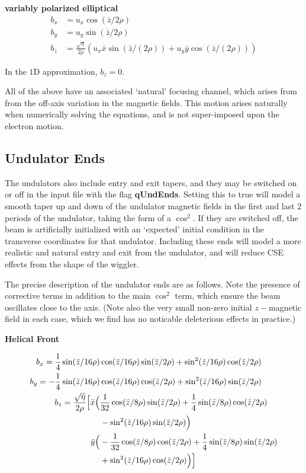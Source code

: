 \documentclass[12pt]{article}%
\begin{document}
{\bf variably polarized elliptical}
\begin{align}
b_x  & = u_x \cos({\bar{z}/2\rho}) \\
b_y & =  u_y \sin({\bar{z}/2\rho}) \\
b_z & = \frac{\sqrt{\eta}}{2\rho} (u_x \bar{x}\sin({\bar{z} / (2 \rho)}) + u_y \bar{y}\cos({\bar{z} / (2 \rho)}))
\end{align}


In the $1$D approximation, $b_z = 0$. 

All of the above have an associated `natural' focusing channel, which arises from from the off-axis variation in the magnetic fields. This motion arises naturally when numerically solving the equations, and is not super-imposed upon the electron motion. 

\subsection{Undulator Ends}

The undulators also include entry and exit tapers, and they may be switched on or off in the input file with the flag {\bf qUndEnds}. Setting this to true will model a smooth taper up and down of the undulator magnetic fields in the first and last 2 periods of the undulator, taking the form of a $\cos^2$. If they are switched off, the beam is artificially initialized with an `expected' initial condition in the transverse coordinates for that undulator. Including these ends will model a more realistic and natural entry and exit from the undulator, and will reduce CSE effects from the shape of the wiggler.

The precise description of the undulator ends are as follows. Note the presence of corrective terms in addition to the main $\cos^2$ term, which ensure the beam oscillates close to the axis. (Note also the very small non-zero initial $z-$magnetic field in each case, which we find  has no noticable deleterious effects in practice.)

{\bf Helical Front}

\begin{align}
b_x  =  \frac{1}{4}\sin(\bar{z}/16\rho) & \cos(\bar{z}/16\rho)    \sin(\bar{z}/2\rho)   +   \sin^2(\bar{z} / 16\rho)  \cos(\bar{z}/2\rho)  \\  
b_y =  - \frac{1}{4}\sin(\bar{z}/16\rho) & \cos(\bar{z}/16\rho)    \cos(\bar{z}/2\rho)   +  \sin^2(\bar{z} / 16\rho)  \sin(\bar{z}/2\rho)\\
b_z = \frac{\sqrt{\eta}}{2\rho} \Bigl[   \bar{x}\Bigl(& \frac{1}{32}\cos( \bar{z}/8\rho )\sin(\bar{z}/2\rho) +
           \frac{1}{4}\sin(\bar{z}/8\rho)\cos(\bar{z}/2\rho) \nonumber  \\
           & - \sin^2(\bar{z}/16\rho)\sin(\bar{z}/2\rho) \Bigr) \nonumber \\
           \bar{y}\Bigl(& -\frac{1}{32}\cos( \bar{z}/8\rho )\cos(\bar{z}/2\rho) +\frac{1}{4}\sin(\bar{z}/8\rho)\sin(\bar{z}/2\rho) \nonumber  \\
           & + \sin^2(\bar{z}/16\rho)\cos(\bar{z}/2\rho) \Bigr)  \Bigr]  
\end{align}
\end{document}
